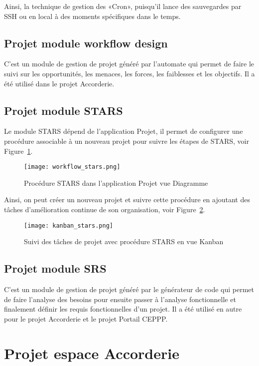 Ainsi, la technique de gestion des «Cron», puisqu’il lance des sauvegardes par SSH ou en local à des moments spécifiques dans le temps.

\subsection{Projet module workflow design}

C’est un module de gestion de projet généré par l’automate qui permet de faire le suivi sur les opportunités, les menaces, les forces, les faiblesses et les objectifs. Il a été utilisé dans le projet Accorderie.

\subsection{Projet module STARS}

Le module STARS dépend de l’application Projet, il permet de configurer une procédure associable à un nouveau projet pour suivre les étapes de STARS, voir Figure~\ref{fig:workflow_stars}.

\begin{figure}
\centering
\texttt{[image: workflow\_stars.png]}
\caption{Procédure STARS dans l'application Projet vue Diagramme}
\label{fig:workflow_stars}
\end{figure}

Ainsi, on peut créer un nouveau projet et suivre cette procédure en ajoutant des tâches d'amélioration continue de son organisation, voir Figure~\ref{fig:kanban_stars}.

\begin{figure}
\centering
\texttt{[image: kanban\_stars.png]}
\caption{Suivi des tâches de projet avec procédure STARS en vue Kanban}
\label{fig:kanban_stars}
\end{figure}

\subsection{Projet module SRS}

C’est un module de gestion de projet généré par le générateur de code qui permet de faire l’analyse des besoins pour ensuite passer à l’analyse fonctionnelle et finalement définir les requis fonctionnelles d’un projet. Il a été utilisé en autre pour le projet Accorderie et le projet Portail CEPPP.

\section{Projet espace Accorderie}


